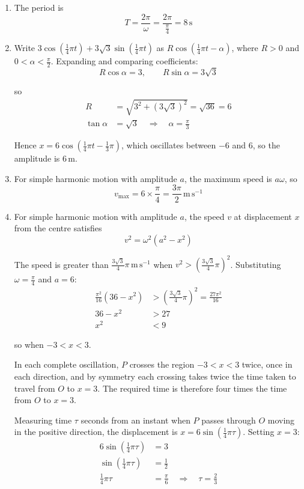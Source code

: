 \documentclass[leqno]{article}
\begin{document}
\begin{enumerate}[
  label=\textbf{\arabic*.},
  leftmargin=*,
  topsep=0pt,
  partopsep=0pt,
  parsep=0pt
]
\begin{djsSolution}
\begin{enumerate}[label=\textbf{(\alph*)}, start=1]
\item The period is
\[
T=\frac{2\pi}{\omega}=\frac{2\pi}{\frac{\pi}{4}}=8\,\mathrm{s}
\]

\item Write \(3\cos\left(\tfrac{1}{4}\pi t\right)+3\sqrt{3}\sin\left(\tfrac{1}{4}\pi t\right)\) as \(R\cos\left(\tfrac{1}{4}\pi t-\alpha\right)\), where \(R>0\) and \(0<\alpha<\frac{\pi}{2}\). Expanding and comparing coefficients:
\[
R\cos\alpha=3,\qquad R\sin\alpha=3\sqrt{3}
\]

so
\begin{align*}
R&=\sqrt{3^2+\left(3\sqrt{3}\right)^2}=\sqrt{36}=6\\
\tan\alpha&=\sqrt{3}\quad\Longrightarrow\quad\alpha=\frac{\pi}{3}
\end{align*}

Hence \(x=6\cos\left(\tfrac{1}{4}\pi t-\tfrac{1}{3}\pi\right)\), which oscillates between \(-6\) and \(6\), so the amplitude is \(6\,\mathrm{m}\).

\item For simple harmonic motion with amplitude \(a\), the maximum speed is \(a\omega\), so
\[
v_{\max}=6\times\frac{\pi}{4}=\frac{3\pi}{2}\,\mathrm{m\,s^{-1}}
\]

\item For simple harmonic motion with amplitude \(a\), the speed \(v\) at displacement \(x\) from the centre satisfies
\[
v^2=\omega^2\left(a^2-x^2\right)
\]

The speed is greater than \(\frac{3\sqrt{3}}{4}\pi\,\mathrm{m\,s^{-1}}\) when \(v^2>\left(\frac{3\sqrt{3}}{4}\pi\right)^2\). Substituting \(\omega=\frac{\pi}{4}\) and \(a=6\):
\begin{align*}
\frac{\pi^2}{16}\left(36-x^2\right)&>\left(\frac{3\sqrt{3}}{4}\pi\right)^2=\frac{27\pi^2}{16}\\
36-x^2&>27\\
x^2&<9
\end{align*}

so when \(-3<x<3\).

In each complete oscillation, \(P\) crosses the region \(-3<x<3\) twice, once in each direction, and by symmetry each crossing takes twice the time taken to travel from \(O\) to \(x=3\). The required time is therefore four times the time from \(O\) to \(x=3\).

Measuring time \(\tau\) seconds from an instant when \(P\) passes through \(O\) moving in the positive direction, the displacement is \(x=6\sin\left(\tfrac{1}{4}\pi\tau\right)\). Setting \(x=3\):
\begin{align*}
6\sin\left(\tfrac{1}{4}\pi\tau\right)&=3\\
\sin\left(\tfrac{1}{4}\pi\tau\right)&=\frac{1}{2}\\
\tfrac{1}{4}\pi\tau&=\frac{\pi}{6}\quad\Longrightarrow\quad\tau=\frac{2}{3}
\end{align*}


\end{enumerate}
\end{djsSolution}
\end{enumerate}
\end{document}
